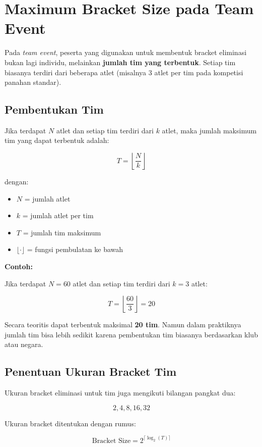\section{Maximum Bracket Size pada Team Event}

Pada \textit{team event}, peserta yang digunakan untuk membentuk bracket eliminasi bukan lagi individu, melainkan \textbf{jumlah tim yang terbentuk}. 
Setiap tim biasanya terdiri dari beberapa atlet (misalnya 3 atlet per tim pada kompetisi panahan standar).

\subsection{Pembentukan Tim}

Jika terdapat $N$ atlet dan setiap tim terdiri dari $k$ atlet, maka jumlah maksimum tim yang dapat terbentuk adalah:

\[
T = \left\lfloor \frac{N}{k} \right\rfloor
\]

dengan:

\begin{itemize}
\item $N$ = jumlah atlet
\item $k$ = jumlah atlet per tim
\item $T$ = jumlah tim maksimum
\item $\lfloor \cdot \rfloor$ = fungsi pembulatan ke bawah
\end{itemize}

\textbf{Contoh:}

Jika terdapat $N = 60$ atlet dan setiap tim terdiri dari $k = 3$ atlet:

\[
T = \left\lfloor \frac{60}{3} \right\rfloor = 20
\]

Secara teoritis dapat terbentuk maksimal \textbf{20 tim}.  
Namun dalam praktiknya jumlah tim bisa lebih sedikit karena pembentukan tim biasanya berdasarkan klub atau negara.

\subsection{Penentuan Ukuran Bracket Tim}

Ukuran bracket eliminasi untuk tim juga mengikuti bilangan pangkat dua:

\[
2, 4, 8, 16, 32
\]

Ukuran bracket ditentukan dengan rumus:

\[
\text{Bracket Size} = 2^{\lceil \log_2(T) \rceil}
\]

